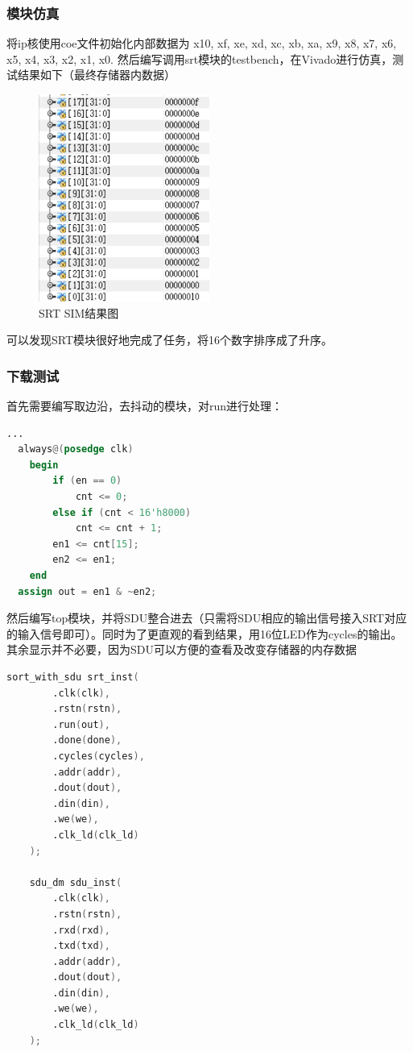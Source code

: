 \documentclass[a4paper]{article}
\begin{document}
\subsubsection{模块仿真} 
将ip核使用coe文件初始化内部数据为 x10, xf, xe, xd, xc, xb, xa, x9, x8, x7, x6, x5, x4, x3, x2, x1, x0.
然后编写调用srt模块的testbench，在Vivado进行仿真，测试结果如下（最终存储器内数据） 
\begin{figure}[H]
    \centering
    \includegraphics[width=0.5\textwidth]{srt_sim.png}
    \caption{SRT SIM结果图}
    \label{fig:srt_sim}
  \end{figure}

可以发现SRT模块很好地完成了任务，将16个数字排序成了升序。

\subsubsection{下载测试}
首先需要编写取边沿，去抖动的模块，对run进行处理：
\begin{lstlisting}[language={verilog},title={edge.v}]
  ...
  always@(posedge clk)
    begin
        if (en == 0)
            cnt <= 0;
        else if (cnt < 16'h8000)
            cnt <= cnt + 1;
        en1 <= cnt[15];
        en2 <= en1;
    end
  assign out = en1 & ~en2;
\end{lstlisting}
然后编写top模块，并将SDU整合进去（只需将SDU相应的输出信号接入SRT对应的输入信号即可）。同时为了更直观的看到结果，用16位LED作为cycles的输出。
其余显示并不必要，因为SDU可以方便的查看及改变存储器的内存数据

\begin{lstlisting}[language={verilog},title={top.v}]
    sort_with_sdu srt_inst(
        .clk(clk),
        .rstn(rstn),
        .run(out),
        .done(done),
        .cycles(cycles),
        .addr(addr),
        .dout(dout),
        .din(din),
        .we(we),
        .clk_ld(clk_ld) 
    );
        
    sdu_dm sdu_inst(
        .clk(clk),
        .rstn(rstn),
        .rxd(rxd),
        .txd(txd),
        .addr(addr),
        .dout(dout),
        .din(din),
        .we(we),
        .clk_ld(clk_ld)
    );

\end{lstlisting}
\end{document}

